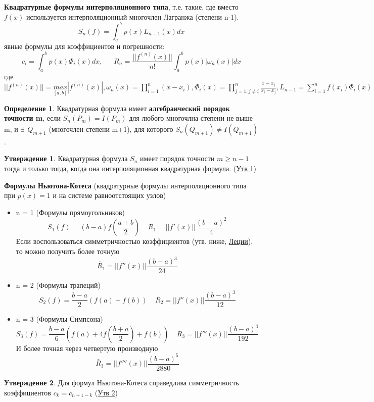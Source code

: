 \documentclass[specialist, subf, href, colorlinks=true, 12pt, times, mtpro, final]{disser}
\theoremstyle{definition}
\newtheorem{defn}{Определение}[section]
\newtheorem{state}{Утверждение}[section]
\begin{document}
	\textbf{Квадратурные формулы интерполяционного типа}, т.е. такие, где вместо $f(x)$ используется интерполяционный многочлен Лагранжа (степени n-1).
	$$
		S_n(f) = \int_a^b p(x) L_{n-1}(x) dx
	$$
	явные формулы для коэффициентов и погрешности:
	$$
		c_i = \int_a^b p(x)\Phi_i (x) dx, \ \ \ \ \ \ \ R_n = \frac{||f^{(n)}(x)||}{n!} \int_a^b p(x)|\omega_n(x)| dx
	$$
	где $||f^{(n)}(x)|| = \underset{[a,b]}{max}|f^{(n)}(x)|, \omega_n(x) = \prod\limits_{i = 1}^n (x - x_i), \Phi_i(x) = \prod\limits_{j = 1, j\ne i}^n \frac{x - x_j}{x_i - x_j}, L_{n-1} = \sum\limits_{i = 1}^n f(x_i) \Phi_i(x)$ \\
	
	\begin{defn}
		Квадратурная формула имеет \textbf{алгебраический порядок точности  m}, если $S_n(P_m) = I(P_m)$ для любого многочлна степени не выше m, и $\exists \ \ Q_{m+1}$ (многочлен степени m+1), для которого $S_n(Q_{m+1}) \ne I(Q_{m+1})$. 
	\end{defn}
	\begin{state}
		Квадратурная формула $S_n$ имеет порядок точности $m \ge n-1$ тогда и только тогда, когда она интерполяционная квадратурная формула. (\hyperlink {lects.38}{Утв 1})
	\end{state}

	\textbf{Формулы Ньютона-Котеса} (квадратурные формулы интерполяционного типа при $p(x) = 1$ и на системе равноотстоящих узлов)
	\begin{itemize}
		\item n = 1 (Формулы прямоугольников)
		$$
			S_1(f) = (b-a)f\left(\frac{a+b}{2}\right) \ \ \ \ \ R_1 = ||f'(x)||\frac{(b - a)^2}{4}
		$$
		Если воспользоваться симметричностью коэффициентов (утв. ниже, \hyperlink {lects.39}{Леции}), то можно получить более точную  
		$$
			\tilde{R_1} = ||f''(x)||\frac{(b-a)^3}{24}
		$$
		\item n = 2 (Формулы трапеций)
		$$
			S_2(f) = \frac{b - a}{2}(f(a) + f(b)) \ \ \ \ \ R_2 = ||f''(x)||\frac{(b-a)^3}{12}
		$$
		\item n = 3 (Формулы Симпсона)
		$$
			S_3(f) = \frac{b - a}{6}\left(f(a) + 4f\left(\frac{b+a}{2}\right) + f(b)\right) \ \ \ \ \ R_3 = ||f'''(x)||\frac{(b-a)^4}{192}
		$$
		И более точная через четвертую производную
		$$
			\tilde{R_3} = ||f''''(x)||\frac{(b-a)^5}{2880}
		$$
	\end{itemize}

	\begin{state}
		Для формул Ньютона-Котеса справедлива симметричность коэффициентов $c_k = c_{n+1-k}$ (\hyperlink {lects.40}{Утв 2})
	\end{state}
\end{document}
